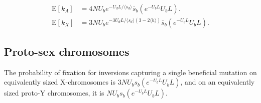 \documentclass[11pt]{article}
\begin{document}
\begin{subequations}
\begin{align}
	\text{E}[k_A] &= 4N U_b e^{-U_d L/\langle s_d \rangle} \overline{s}_b (e^{-U_b L} U_b L). \\
	\text{E}[k_X] &= 3 N U_b e^{- 3 U_d L/\langle s_d \rangle(3 - 2 \langle h \rangle)} \overline{s}_b (e^{-U_b L} U_b L).
\end{align}
\end{subequations}



\subsection*{Proto-sex chromosomes}

The probability of fixation for inversions capturing a single beneficial mutation on equivalently sized X-chromosomes is $3 N U_b s_b (e^{-U_b L} U_b L)$, and on an equivalently sized proto-Y chromosomes, it is $N U_b s_b (e^{-U_b L} U_b L)$.

\end{document}
